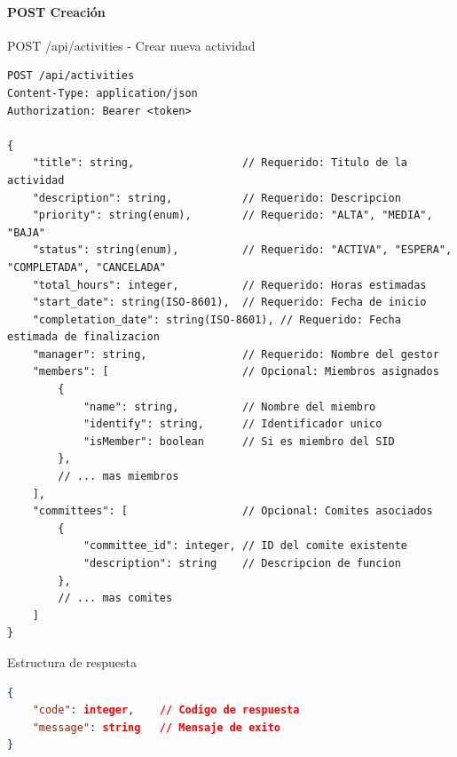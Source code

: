 \documentclass[11pt,a4paper]{article}
\begin{document}
\paragraph{POST Creación}
\begin{center}
	\begin{minipage}{\textwidth}
		\begin{codebox}{POST /api/activities - Crear nueva actividad}
			\begin{lstlisting}[language=HTTP]
POST /api/activities
Content-Type: application/json
Authorization: Bearer <token>

{
    "title": string,                 // Requerido: Titulo de la actividad
    "description": string,           // Requerido: Descripcion
    "priority": string(enum),        // Requerido: "ALTA", "MEDIA", "BAJA"
    "status": string(enum),          // Requerido: "ACTIVA", "ESPERA", "COMPLETADA", "CANCELADA"
    "total_hours": integer,          // Requerido: Horas estimadas
    "start_date": string(ISO-8601),  // Requerido: Fecha de inicio
    "completation_date": string(ISO-8601), // Requerido: Fecha estimada de finalizacion
    "manager": string,               // Requerido: Nombre del gestor
    "members": [                     // Opcional: Miembros asignados
        {
            "name": string,          // Nombre del miembro
            "identify": string,      // Identificador unico
            "isMember": boolean      // Si es miembro del SID
        },
        // ... mas miembros
    ],
    "committees": [                  // Opcional: Comites asociados
        {
            "committee_id": integer, // ID del comite existente
            "description": string    // Descripcion de funcion
        },
        // ... mas comites
    ]
}
\end{lstlisting}
		\end{codebox}
	\end{minipage}
\end{center}

\begin{center}
	\begin{minipage}{\textwidth}
		\begin{codebox}{Estructura de respuesta}
			\begin{lstlisting}[language=json]
{
    "code": integer,    // Codigo de respuesta
    "message": string   // Mensaje de exito
}
\end{lstlisting}
		\end{codebox}
	\end{minipage}
\end{center}
\end{document}
